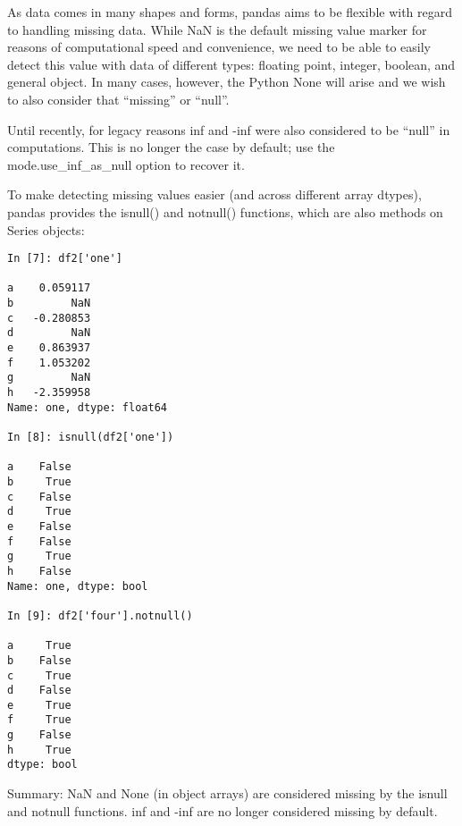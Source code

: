 \documentclass[11pt]{article} %
\begin{document}
As data comes in many shapes and forms, pandas aims to be flexible with regard to handling missing data. While NaN is the default missing value marker for reasons of computational speed and convenience, we need to be able to easily detect this value with data of different types: floating point, integer, boolean, and general object. In many cases, however, the Python None will arise and we wish to also consider that “missing” or “null”.

Until recently, for legacy reasons inf and -inf were also considered to be “null” in computations. This is no longer the case by default; use the mode.use_inf_as_null option to recover it.

To make detecting missing values easier (and across different array dtypes), pandas provides the isnull() and notnull() functions, which are also methods on Series objects:

\begin{verbatim}
In [7]: df2['one']

a    0.059117
b         NaN
c   -0.280853
d         NaN
e    0.863937
f    1.053202
g         NaN
h   -2.359958
Name: one, dtype: float64

In [8]: isnull(df2['one'])

a    False
b     True
c    False
d     True
e    False
f    False
g     True
h    False
Name: one, dtype: bool

In [9]: df2['four'].notnull()

a     True
b    False
c     True
d    False
e     True
f     True
g    False
h     True
dtype: bool
\end{verbatim}
Summary: NaN and None (in object arrays) are considered missing by the isnull and notnull functions. inf and -inf are no longer considered missing by default.
\end{document}
